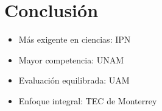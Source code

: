 \documentclass[12pt]{article}
\begin{document}
\vspace{0.5cm}

\section*{Conclusión}

\begin{itemize}
\item Más exigente en ciencias: IPN
\item Mayor competencia: UNAM
\item Evaluación equilibrada: UAM
\item Enfoque integral: TEC de Monterrey
\end{itemize}
\end{document}
